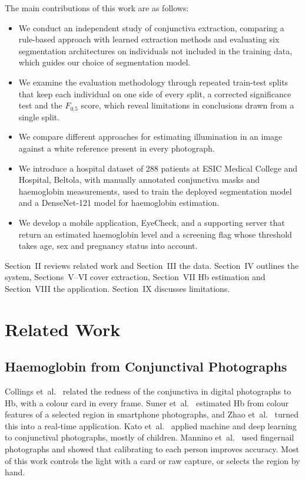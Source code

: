 \documentclass[conference]{IEEEtran}
\begin{document}
The main contributions of this work are as follows:
\begin{itemize}
  \item We conduct an independent study of conjunctiva extraction, comparing a
    rule-based approach with learned extraction methods and evaluating six
    segmentation architectures on individuals not included in the training
    data, which guides our choice of segmentation model.
  \item We examine the evaluation methodology through repeated train-test
    splits that keep each individual on one side of every split, a corrected
    significance test and the $F_{0.5}$ score, which reveal limitations in
    conclusions drawn from a single split.
  \item We compare different approaches for estimating illumination in an image
    against a white reference present in every photograph.
  \item We introduce a hospital dataset of 288 patients at ESIC Medical College
    and Hospital, Beltola, with manually annotated conjunctiva masks and
    haemoglobin measurements, used to train the deployed segmentation model and
    a DenseNet-121 model for haemoglobin estimation.
  \item We develop a mobile application, EyeCheck, and a supporting server that
    return an estimated haemoglobin level and a screening flag whose threshold
    takes age, sex and pregnancy status into account.
\end{itemize}
Section~II reviews related work and Section~III the data. Section~IV outlines
the system, Sections~V--VI cover extraction, Section~VII Hb estimation and
Section~VIII the application. Section~IX discusses limitations.

\section{Related Work}
\subsection{Haemoglobin from Conjunctival Photographs}
Collings et~al.~\cite{collings2016} related the redness of the conjunctiva in
digital photographs to Hb, with a colour card in every frame. Suner
et~al.~\cite{suner2021} estimated Hb from colour features of a selected region
in smartphone photographs, and Zhao et~al.~\cite{zhao2024} turned this into a
real-time application. Kato et~al.~\cite{kato2024} applied machine and deep
learning to conjunctival photographs, mostly of children. Mannino
et~al.~\cite{mannino2018} used fingernail photographs and showed that
calibrating to each person improves accuracy. Most of this work controls the
light with a card or raw capture, or selects the region by hand.
\end{document}
